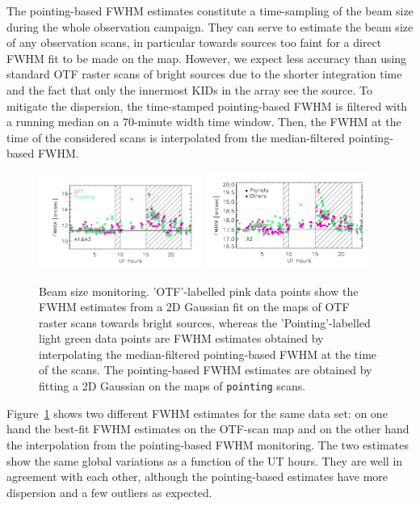 \documentclass[traditionalabstract]{aa}
\newcommand{\lp}[1]{#1}
\begin{document}
\begin{appendix}
The pointing-based FWHM estimates constitute a time-sampling of the
beam size during the whole observation campaign. They can serve to
estimate the beam size of any observation scans, in particular
towards sources too faint for a direct FWHM %
fit to be made on the map. However, we
expect less accuracy than using standard OTF raster
scans of bright sources due to the shorter integration time and the
fact that only the innermost KIDs in the array see the source.
To mitigate the dispersion, the time-stamped
pointing-based FWHM
is filtered with a running median on a 70-minute
width time window. Then, the FWHM %
at the time of the considered scans is
interpolated from the median-filtered pointing-based FWHM.%
%
\begin{figure}[ht!]
  \begin{center}
    \includegraphics[clip=true, trim={0.9cm, 0.5cm, 0.5cm, 0.5cm}, width=0.4725\textwidth]{Figures/Beam_monitoring_with_otfs_vs_ut_compare_pointings_1mm.pdf}
    \includegraphics[clip=true, trim={0.5cm, 0.5cm, 0.5cm, 0.5cm}, width=0.4875\textwidth]{Figures/Beam_monitoring_with_otfs_vs_ut_compare_pointings_a2.pdf}
    \caption[Beam size monitoring comparison]{Beam size monitoring.
     'OTF'-labelled pink data points show the FWHM estimates from a 2D
    Gaussian fit on the maps of OTF raster scans towards bright
    sources, whereas the 'Pointing'-labelled light green data points
    are FWHM estimates obtained by interpolating the {\lp
    median-filtered} pointing-based FWHM at the time of the
    scans. {\lp The
    pointing-based FWHM estimates are obtained by fitting a 2D Gaussian on the
    maps of {\tt pointing} scans.}}
\label{fig:beam_monitoring_compare}
\end{center}
\end{figure}
%
Figure~\ref{fig:beam_monitoring_compare} shows two different FWHM %
estimates for the same data set: on one hand the best-fit FWHM %
estimates on the OTF-scan map and on the other hand the interpolation from
the pointing-based FWHM %
monitoring. The two estimates show the same global variations as a
function of the UT hours. They are well in agreement with each
other, although the pointing-based estimates have more dispersion and
a few outliers as expected.



\end{appendix}
\end{document}
